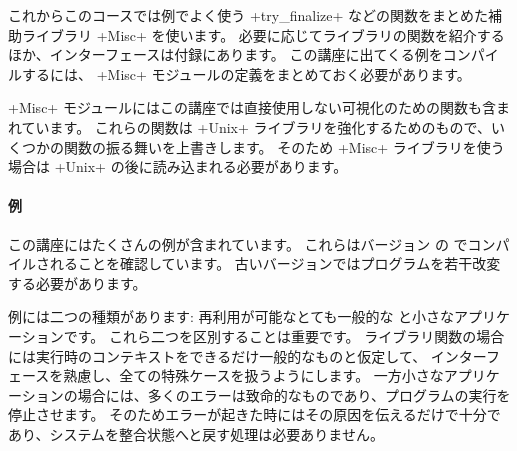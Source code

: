 これからこのコースでは例でよく使う \ml+try_finalize+ などの関数をまとめた補助ライブラリ \ml+Misc+ を使います。
必要に応じてライブラリの関数を紹介するほか、インターフェースは付録にあります。
この講座に出てくる例をコンパイルするには、 \ml+Misc+ モジュールの定義をまとめておく必要があります。

\ml+Misc+ モジュールにはこの講座では直接使用しない可視化のための関数も含まれています。
これらの関数は \ml+Unix+ ライブラリを強化するためのもので、いくつかの関数の振る舞いを上書きします。
そのため \ml+Misc+ ライブラリを使う場合は \ml+Unix+ の後に読み込まれる必要があります。

\paragraph{例}

この講座にはたくさんの例が含まれています。 これらはバージョン \ocamlversion の \ocaml
でコンパイルされることを確認しています。
古いバージョンではプログラムを若干改変する必要があります。

例には二つの種類があります: 再利用が可能なとても一般的な  と小さなアプリケーションです。
これら二つを区別することは重要です。
ライブラリ関数の場合には実行時のコンテキストをできるだけ一般的なものと仮定して、
インターフェースを熟慮し、全ての特殊ケースを扱うようにします。
一方小さなアプリケーションの場合には、多くのエラーは致命的なものであり、プログラムの実行を停止させます。
そのためエラーが起きた時にはその原因を伝えるだけで十分であり、システムを整合状態へと戻す処理は必要ありません。
